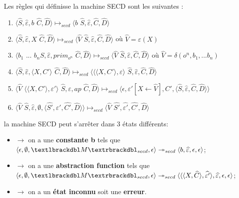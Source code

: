 \documentclass[10pt,a4paper]{article}
\begin{document}
			Les règles qui définisse la machine SECD sont les suivantes :
			
			\begin{enumerate}
				\item $\langle\widehat{S},\widehat{\varepsilon},b$ $\widehat{C},\widehat{D}\rangle \longmapsto_{secd} \langle b$ $\widehat{S},\widehat{\varepsilon},\widehat{C},\widehat{D}\rangle$
				\item $\langle\widehat{S},\widehat{\varepsilon},X$ $\widehat{C},\widehat{D}\rangle \longmapsto_{secd} \langle \widehat{V}$ $\widehat{S},\widehat{\varepsilon},\widehat{C},\widehat{D}\rangle$ où $\widehat{V} = \varepsilon(X)$
				\item $\langle b_{1}$ $...$ $b_{n}\widehat{S},\widehat{\varepsilon},prim_{o^{n}}$ $\widehat{C},\widehat{D}\rangle \longmapsto_{secd} \langle \widehat{V}$ $\widehat{S},\widehat{\varepsilon},\widehat{C},\widehat{D}\rangle$ où $\widehat{V} = \delta(o^{n},b_1,...b_{n})$
				\item $\langle\widehat{S},\widehat{\varepsilon},\langle X,C'\rangle$ $\widehat{C},\widehat{D}\rangle \longmapsto_{secd} \langle\langle\langle X,C'\rangle,\varepsilon\rangle$ $\widehat{S},\widehat{\varepsilon},\widehat{C},\widehat{D}\rangle$
				\item $\langle\widehat{V}$ $\langle\langle X,C'\rangle,\varepsilon'\rangle$ $\widehat{S},\widehat{\varepsilon},ap$ $\widehat{C},\widehat{D}\rangle \longmapsto_{secd} \langle\epsilon,\varepsilon'[X \leftarrow \widehat{V}],C',\langle\widehat{S},\widehat{\varepsilon},\widehat{C},\widehat{D}\rangle\rangle$
				\item $\langle\widehat{V}$ $\widehat{S},\widehat{\varepsilon},\emptyset,\langle\widehat{S'},\widehat{\varepsilon'},\widehat{C'},\widehat{D}\rangle\rangle \longmapsto_{secd} \langle \widehat{V}$ $\widehat{S'},\widehat{\varepsilon'},\widehat{C'},\widehat{D}\rangle$
			\end{enumerate}
			\bigbreak
			
			la machine SECD peut s'arrêter dans 3 états différents:
			\begin{itemize}
				\item[]$\longrightarrow$ on a une \textbf{constante b} tels que $\langle \epsilon,\emptyset,\textlbrackdbl M\textrbrackdbl_{secd},\epsilon\rangle \twoheadrightarrow_{secd} \langle b,\widehat{\varepsilon},\epsilon,\epsilon\rangle$;
				\item[]$\longrightarrow$ on a une \textbf{abstraction function} tels que $\langle \epsilon,\emptyset,\textlbrackdbl M\textrbrackdbl_{secd},\epsilon\rangle \twoheadrightarrow_{secd} \langle\langle\langle X,\widehat{C}\rangle,\widehat{\varepsilon'}\rangle,\widehat{\varepsilon},\epsilon,\epsilon\rangle$;
				\item[]$\longrightarrow$ on a un \textbf{état inconnu} soit une \textbf{erreur}.
			\end{itemize}
			\bigbreak
			
\end{document}
